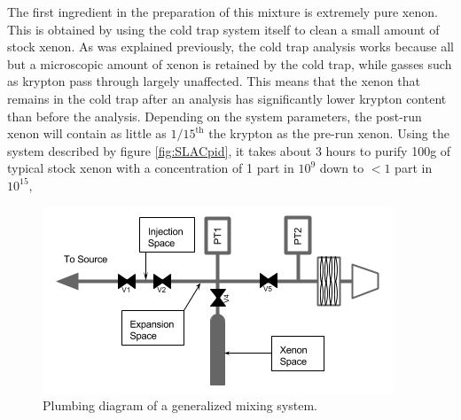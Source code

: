 The first ingredient in the preparation of this mixture is extremely pure xenon. This is obtained by using the cold trap system itself to clean a small amount of stock xenon. As was explained previously, the cold trap analysis works because all but a microscopic amount of xenon is retained by the cold trap, while gasses such as krypton pass through largely unaffected. This means that the xenon that remains in the cold trap after an analysis has significantly lower krypton content than before the analysis. Depending on the system parameters, the post-run xenon will contain as little as $1/15^{\textrm{th}}$ the krypton as the pre-run xenon. Using the system described by figure \ref{fig:SLACpid}, it takes about 3 hours to purify 100g of typical stock xenon with a concentration of 1 part in $10^{9}$ down to $< 1$ part in $10^{15}$, 
\begin{figure}[h!]
  \includegraphics[width=\linewidth]{Figures/Mixing_diagram.png}
  \caption{Plumbing diagram of a generalized mixing system. }
  \label{fig:mixpid}
\end{figure}

